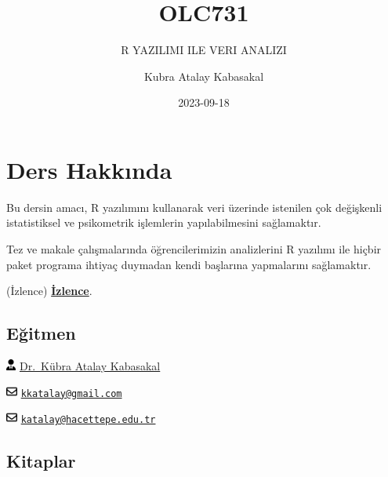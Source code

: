\documentclass[
  oneside]{book}
\title{OLC731}
\subtitle{R YAZILIMI ILE VERI ANALIZI}
\author{Kubra Atalay Kabasakal}
\date{2023-09-18}
\begin{document}
\maketitle

{
\setcounter{tocdepth}{1}
\tableofcontents
}
\hypertarget{ders-hakkux131nda}{%
\chapter*{Ders Hakkında}\label{ders-hakkux131nda}}

Bu dersin amacı, R yazılımını kullanarak veri üzerinde istenilen çok değişkenli istatistiksel ve psikometrik işlemlerin yapılabilmesini sağlamaktır.

Tez ve makale çalışmalarında öğrencilerimizin analizlerini R yazılımı ile hiçbir paket programa ihtiyaç duymadan kendi başlarına yapmalarını sağlamaktır.

(İzlence) \href{https://akts.hacettepe.edu.tr/ders_detay.php?ders_ref=DRSTNM_0000000000000000000018497\&ders_kod=OLC731\&zs_link=2\&prg_kod=21134\&submenuheader=2}{\textbf{İzlence}}.

\hypertarget{eux11fitmen}{%
\section*{Eğitmen}\label{eux11fitmen}}

\includegraphics[width=0.88em,height=1em]{index_files/figure-latex/fa-icon-b6db0f254c80bc493dbb13c250115ecc.pdf} \href{https://avesis.hacettepe.edu.tr/katalay}{Dr.~Kübra Atalay Kabasakal}

\includegraphics[width=1em,height=1em]{index_files/figure-latex/fa-icon-f768fe0dd920858851ba0f42fb5fcbf3.pdf} \href{mailto:kkatalay@gmail.com}{\nolinkurl{kkatalay@gmail.com}}

\includegraphics[width=1em,height=1em]{index_files/figure-latex/fa-icon-f768fe0dd920858851ba0f42fb5fcbf3.pdf} \href{mailto:katalay@hacettepe.edu.tr}{\nolinkurl{katalay@hacettepe.edu.tr}}

\hypertarget{kitaplar}{%
\section*{Kitaplar}\label{kitaplar}}
\end{document}
